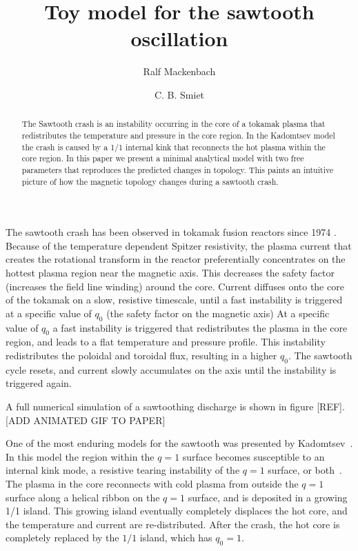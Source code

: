 \documentclass[%
superscriptaddress,
amsmath,amssymb,
aps,
pre,
floatfix,
]{revtex4-2}
\begin{document}
\title{Toy model for the sawtooth oscillation}
\author{Ralf Mackenbach}
\author{C. B. Smiet}

\begin{abstract}
  The Sawtooth crash is an instability occurring in the core of a tokamak plasma that redistributes the temperature and pressure in the core region.
  In the Kadomtsev model the crash is caused by a 1/1 internal kink that reconnects the hot plasma within the core region.
  In this paper we present a minimal analytical model with two free parameters that reproduces the predicted changes in topology.
  This paints an intuitive picture of how the magnetic topology changes during a sawtooth crash.
\end{abstract}
\maketitle

The sawtooth crash has been observed in tokamak fusion reactors since 1974 \cite{von1974studies, vershkov1974role}.
Because of the temperature dependent Spitzer resistivity, the plasma current that creates the rotational transform in the reactor preferentially concentrates on the hottest plasma region near the magnetic axis.
This decreases the safety factor (increases the field line winding) around the core.
Current diffuses onto the core of the tokamak on a slow, resistive timescale, until a fast instability is triggered at a specific value of $q_0$ (the safety factor on the magnetic axis)
At a specific value of $q_0$ a fast instability is triggered that redistributes the plasma in the core region, and leads to a flat temperature and pressure profile.
This instability redistributes the poloidal and toroidal flux, resulting in a higher $q_0$.
The sawtooth cycle resets, and current slowly accumulates on the axis until the instability is triggered again.

A full numerical simulation of a sawtoothing discharge is shown in figure [REF]. [ADD ANIMATED GIF TO PAPER]

One of the most enduring models for the sawtooth was presented by Kadomtsev~\cite{kadomtsev1975disruptive}.
In this model the region within the $q=1$ surface becomes susceptible to an internal kink mode, a resistive tearing instability of the $q=1$ surface, or both~\cite{coppi1976resistive}.
The plasma in the core reconnects with cold plasma from outside the $q=1$ surface along a helical ribbon on the $q=1$ surface, and is deposited in a growing 1/1 island.
This growing island eventually completely displaces the hot core, and the temperature and current are re-distributed.
After the crash, the hot core is completely replaced by the $1/1$ island, which has $q_0=1$.
\end{document}
